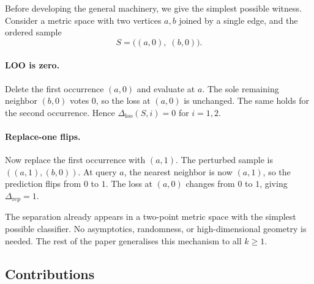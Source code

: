 Before developing the general machinery, we give the simplest possible witness.
Consider a metric space with two vertices $a,b$ joined by a single edge, and
the ordered sample
\[
S = \big((a,0),\;(b,0)\big).
\]

\paragraph{LOO is zero.}
Delete the first occurrence $(a,0)$ and evaluate at $a$.  The sole remaining
neighbor $(b,0)$ votes $0$, so the loss at $(a,0)$ is unchanged.  The same
holds for the second occurrence.  Hence $\Delta_{\mathrm{loo}}(S,i)=0$ for
$i=1,2$.

\paragraph{Replace-one flips.}
Now replace the first occurrence with $(a,1)$.  The perturbed sample is
$((a,1),(b,0))$.  At query $a$, the nearest neighbor is now $(a,1)$, so the
prediction flips from $0$ to $1$.  The loss at $(a,0)$ changes from $0$ to
$1$, giving $\Delta_{\mathrm{rep}}=1$.

The separation already appears in a two-point metric space with the simplest
possible classifier.  No asymptotics, randomness, or high-dimensional geometry
is needed.  The rest of the paper generalises this mechanism to all $k \ge 1$.

\subsection{Contributions}

